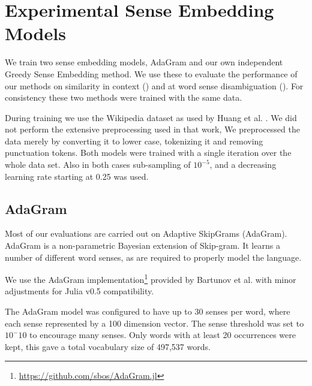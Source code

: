 \documentclass{sig-alternate}
\begin{document}
\section{Experimental Sense Embedding Models}
We train two sense embedding models, AdaGram \parencite{AdaGrams} and our own independent Greedy Sense Embedding method. We use these to evaluate the performance of our methods on similarity in context () and at word sense disambiguation (). For consistency these two methods were trained with the same data.

During training we use the Wikipedia dataset as used by Huang et al. \parencite{Huang2012}.
We did not perform the extensive preprocessing used in that work,
We preprocessed the data merely by converting it to lower case, tokenizing it and removing punctuation tokens.
Both models were trained with a single iteration over the whole data set.
Also in both cases sub-sampling of $10^{-5}$, and a decreasing learning rate starting at 0.25 was used.

\subsection{AdaGram}
Most of our evaluations are carried out on Adaptive SkipGrams (AdaGram)\parencite{AdaGrams}. AdaGram is a non-parametric Bayesian extension of Skip-gram. It learns a number of different word senses, as are required to properly model the language.

We use the AdaGram  implementation\footnote{\url{https://github.com/sbos/AdaGram.jl}} provided by Bartunov et al. \parencite{AdaGrams} with minor adjustments for Julia \parencite{Julia} v0.5 compatibility.


The AdaGram model was configured to have up to 30 senses per word, where each sense represented by a 100 dimension vector. The sense threshold was set to $10^-10$ to encourage many senses.
Only words with at least 20 occurrences were kept, this gave a total vocabulary size of 497,537 words.




\end{document}
